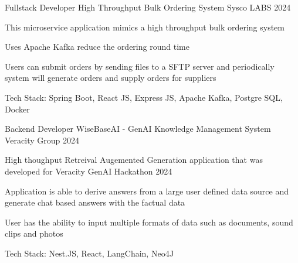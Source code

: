 

\begin{cventries}
    
    
    
    \cventry
    {Fullstack Developer} %
    {High Throughput Bulk Ordering System \href{https://visionvid.vercel.app/}{\faGithubSquare}} %
    {Sysco LABS} %
    {2024} %
    {
        \begin{cvitems} %
            \item {This microservice application mimics a high throughput bulk ordering system}
            \item {Uses Apache Kafka reduce the ordering round time}
            \item {Users can submit orders by sending files to a SFTP server and periodically system will generate orders and supply orders for suppliers}
            \item {Tech Stack: Spring Boot, React JS, Express JS, Apache Kafka, Postgre SQL, Docker}
        \end{cvitems}
    } 



    \cventry
    {Backend Developer} %
    {WiseBaseAI - GenAI Knowledge Management System \href{https://visionvid.vercel.app/}{\faGithubSquare}} %
    {Veracity Group} %
    {2024} %
    {
        \begin{cvitems} %
            \item {High thoughput Retreival Augemented Generation application that was developed for Veracity GenAI Hackathon 2024}
            \item {Application is able to derive answers from a large user defined data source and generate chat based answers with the factual data}
            \item {User has the ability to input multiple formats of data such as documents, sound clips and photos}
            \item {Tech Stack: Nest.JS, React, LangChain, Neo4J}
        \end{cvitems}
    } 
    

\end{cventries}
